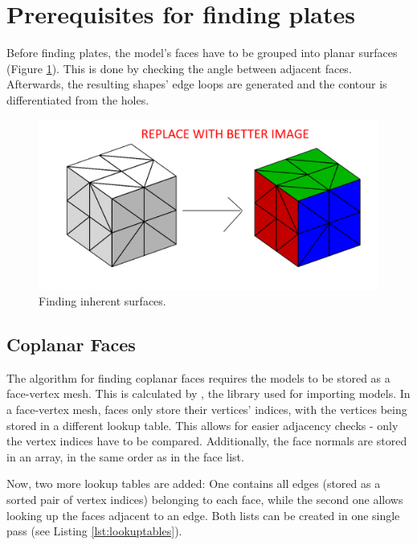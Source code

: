 \documentclass[../ClassicThesis.tex]{subfiles}
\begin{document}
\section{Prerequisites for finding plates}

Before finding plates, the model's faces have to be grouped into planar surfaces (Figure \ref{fig:coplanar}). This is done by checking the angle between adjacent faces. Afterwards, the resulting shapes' edge loops are generated and the contour is differentiated from the holes.

\begin{figure}
    \centering
    \includegraphics[width=1.0\columnwidth]{Images/plates_coplanar.png}
    \caption{Finding inherent surfaces.}
    \label{fig:coplanar}
\end{figure}

\subsection{Coplanar Faces}

The algorithm for finding coplanar faces requires the models to be stored as a face-vertex mesh. This is calculated by \meshlib, the library used for importing models. In a face-vertex mesh, faces only store their vertices' indices, with the vertices being stored in a different lookup table. This allows for easier adjacency checks - only the vertex indices have to be compared. Additionally, the face normals are stored in an array, in the same order as in the face list.

Now, two more lookup tables are added: One contains all edges (stored as a sorted pair of vertex indices) belonging to each face, while the second one allows looking up the faces adjacent to an edge. Both lists can be created in one single pass (see Listing \ref{lst:lookuptables}). 
\end{document}
